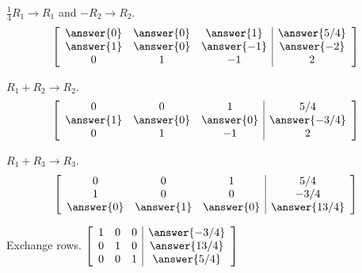 \documentclass{ximera}
\begin{document}
\begin{problem}
\begin{problem}
\begin{problem}
\begin{problem}
\begin{problem}
\begin{prompt} $\frac{1}{4}R_1\rightarrow R_1$ and $-R_2\rightarrow R_2$.
$$\left[\begin{array}{ccc|c}  
\answer{0}&\answer{0}&\answer{1}&\answer{5/4}\\\answer{1}&\answer{0}&\answer{-1}&\answer{-2}\\0&1&-1&2
 \end{array}\right]$$
\end{prompt}

\begin{problem}
\begin{prompt} $R_1+R_2\rightarrow R_2$.
$$\left[\begin{array}{ccc|c}  
0&0&1&5/4\\\answer{1}&\answer{0}&\answer{0}&\answer{-3/4}\\0&1&-1&2
 \end{array}\right]$$
 \end{prompt}
 
 \begin{problem}
 \begin{prompt} $R_1+R_3\rightarrow R_3$.
$$\left[\begin{array}{ccc|c}  
0&0&1&5/4\\1&0&0&-3/4\\\answer{0}&\answer{1}&\answer{0}&\answer{13/4}
 \end{array}\right]$$
 \end{prompt}
 
 \begin{problem}
 \begin{prompt} Exchange rows.
$\left[\begin{array}{ccc|c}  
 1&0&0&\answer{-3/4}\\0&1&0&\answer{13/4}\\0&0&1&\answer{5/4}
 \end{array}\right]$
 \end{prompt}

 \end{problem}
  \end{problem}
   \end{problem}
    \end{problem}
     \end{problem}
      \end{problem}
       \end{problem}
        \end{problem}
\end{document}
